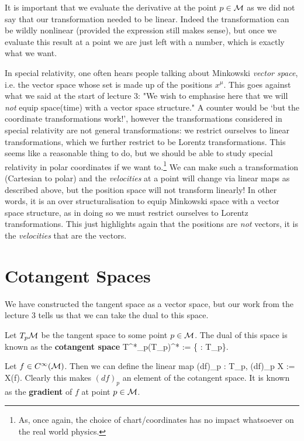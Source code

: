 It is important that we evaluate the derivative at the point $p\in\mathcal{M}$ as we did not say that our transformation needed to be linear. Indeed the transformation can be wildly nonlinear (provided the expression still makes sense), but once we evaluate this result at a point we are just left with a number, which is exactly what we want. 

\br 
\label{rem:SpecialRelLorentz}
    In special relativity, one often hears people talking about Minkowski \textit{vector space}, i.e. the vector space whose set is made up of the positions $x^{\mu}$. This goes against what we said at the start of lecture 3: "We wish to emphasise here that we will \textit{not} equip space(time) with a vector space structure." A counter would be `but the coordinate transformations work!', however the transformations considered in special relativity are not general transformations: we restrict ourselves to linear transformations, which we further restrict to be Lorentz transformations. This seems like a reasonable thing to do, but we should be able to study special relativity in polar coordinates if we want to.\footnote{As, once again, the choice of chart/coordinates has no impact whatsoever on the real world physics.} We can make such a transformation (Cartesian to polar) and the \textit{velocities} at a point will change via linear maps as described above, but the position space will not transform linearly! In other words, it is an over structuralisation to equip Minkowski space with a vector space structure, as in doing so we must restrict ourselves to Lorentz transformations. This just highlights again that the positions are \textit{not} vectors, it is the \textit{velocities} that are the vectors. 
\er 

\section{Cotangent Spaces}

We have constructed the tangent space as a vector space, but our work from the lecture 3 tells us that we can take the dual to this space.

    Let $T_p\mathcal{M}$ be the tangent space to some point $p\in\mathcal{M}$. The dual of this space is known as the \textbf{cotangent space}
    \bse 
        T^*_p\cM \equiv (T_p\cM)^* := \{ \varphi : T_p\cM \lmap \R \}.
    \ese 
\ed 

\bd[Gradient of $f$ at $p$] 
    Let $f\in C^{\infty}(\mathcal{M})$. Then we can define the linear map 
    \bse 
        (df)_p : T_p\cM \lmap \R, \qquad (df)_p X := X(f). 
    \ese 
    Clearly this makes $(df)_p$ an element of the cotangent space. It is known as the \textbf{gradient} of $f$ at point $p\in\mathcal{M}$.
\ed


